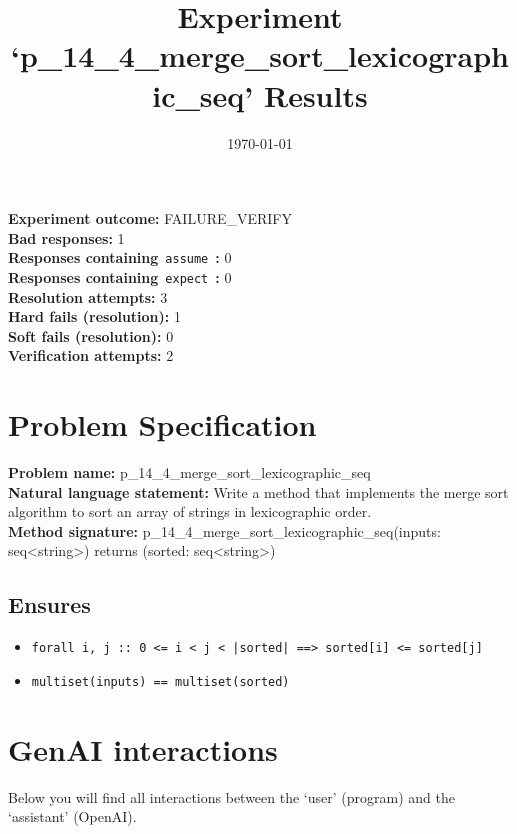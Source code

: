 \documentclass{article}
\begin{document}
\title{Experiment `p\_14\_4\_merge\_sort\_lexicographic\_seq' Results}
\author{\today}
\date{}
\maketitle
\textbf{Experiment outcome: }FAILURE\_VERIFY
\\\textbf{Bad responses: }1
\\\textbf{Responses containing}~\texttt{assume}~\textbf{: }0
\\\textbf{Responses containing}~\texttt{expect}~\textbf{: }0
\\\textbf{Resolution attempts: }3
\\\textbf{Hard fails (resolution): }1
\\\textbf{Soft fails (resolution): }0
\\\textbf{Verification attempts: }2
\section*{Problem Specification}
\textbf{Problem name: }p\_14\_4\_merge\_sort\_lexicographic\_seq
\\\textbf{Natural language statement: }Write a method that implements the merge sort algorithm to sort an array of strings in lexicographic order.
\\\textbf{Method signature: }p\_14\_4\_merge\_sort\_lexicographic\_seq(inputs: seq<string>) returns (sorted: seq<string>)
\subsection*{Ensures}
\begin{itemize}
\item \texttt{forall i, j :: 0 <= i < j < |sorted| ==> sorted[i] <= sorted[j]}
\item \texttt{multiset(inputs) == multiset(sorted)}
\end{itemize}
\clearpage
\section*{GenAI interactions}
Below you will find all interactions between the `user' (program) and the `assistant' (OpenAI).
\end{document}
